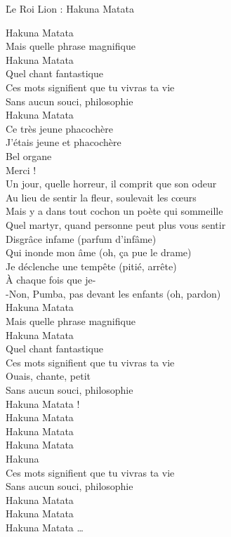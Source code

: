 \documentclass{novel}
\begin{document}
\newpage
\normalsize
\h*{Le Roi Lion : Hakuna Matata}
\begin{multicols}{2}
Hakuna Matata \\
Mais quelle phrase magnifique \\
Hakuna Matata \\
Quel chant fantastique \\

Ces mots signifient que tu vivras ta vie \\
Sans aucun souci, philosophie \\

Hakuna Matata \\
Ce très jeune phacochère \\
J'étais jeune et phacochère \\
Bel organe \\
Merci !\\

Un jour, quelle horreur, il comprit que son odeur \\
Au lieu de sentir la fleur, soulevait les cœurs \\

Mais y a dans tout cochon un poète qui sommeille \\

Quel martyr, quand personne peut plus vous sentir \\

Disgrâce infame (parfum d'infâme) \\
Qui inonde mon âme (oh, ça pue le drame) \\
Je déclenche une tempête (pitié, arrête) \\
À chaque fois que je- \\

-Non, Pumba, pas devant les enfants (oh, pardon) \\

Hakuna Matata \\
Mais quelle phrase magnifique \\
Hakuna Matata \\
Quel chant fantastique \\

Ces mots signifient que tu vivras ta vie \\
Ouais, chante, petit \\
Sans aucun souci, philosophie \\

Hakuna Matata !\\

Hakuna Matata \\
Hakuna Matata \\
Hakuna Matata \\
Hakuna \\

Ces mots signifient que tu vivras ta vie \\
Sans aucun souci, philosophie \\

Hakuna Matata \\
Hakuna Matata \\
Hakuna Matata …\\
\end{multicols}
\end{document}
